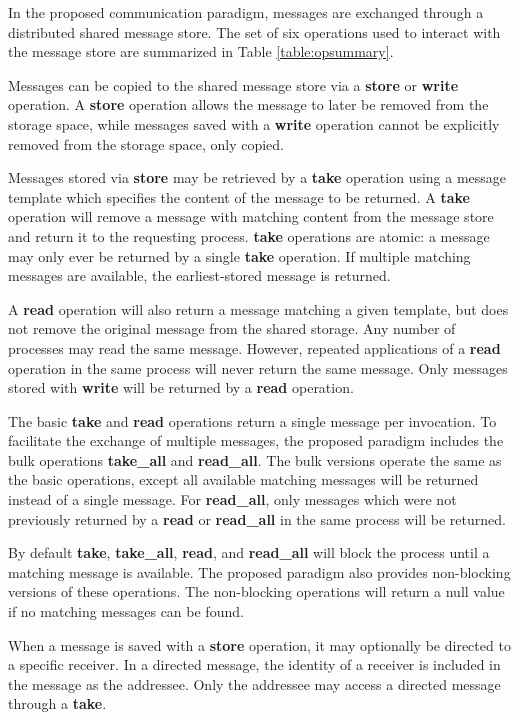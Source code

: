 \documentclass[lnicst]{svmultln}
\begin{document}
In the proposed communication paradigm, messages are exchanged through a distributed shared message store. The set of six operations used to interact with the message store are summarized in Table \ref{table:opsummary}.

Messages can be copied to the shared message store via a \textbf{store} or \textbf{write} operation. A \textbf{store} operation allows the message to later be removed from the storage space, while messages saved with a \textbf{write} operation cannot be explicitly removed from the storage space, only copied.

Messages stored via \textbf{store} may be retrieved by a \textbf{take} operation using a message template which specifies the content of the message to be returned. A \textbf{take} operation will remove a message with matching content from the message store and return it to the requesting process. \textbf{take} operations are atomic: a message may only ever be returned by a single \textbf{take} operation. If multiple matching messages are available, the earliest-stored message is returned.

A \textbf{read} operation will also return a message matching a given template, but does not remove the original message from the shared storage. Any number of processes may read the same message. However, repeated applications of a \textbf{read} operation in the same process will never return the same message. Only messages stored with \textbf{write} will be returned by a \textbf{read} operation.

The basic \textbf{take} and \textbf{read} operations return a single message per invocation. To facilitate the exchange of multiple messages, the proposed paradigm includes the bulk operations \textbf{take\_all} and \textbf{read\_all}. The bulk versions operate the same as the basic operations, except all available matching messages will be returned instead of a single message. For \textbf{read\_all}, only messages which were not previously returned by a \textbf{read} or \textbf{read\_all} in the same process will be returned.

By default \textbf{take}, \textbf{take\_all}, \textbf{read}, and \textbf{read\_all} will block the process until a matching message is available. The proposed paradigm also provides non-blocking versions of these operations. The non-blocking operations will return a null value if no matching messages can be found.

When a message is saved with a \textbf{store} operation, it may optionally be directed to a specific receiver. In a directed message, the identity of a receiver is included in the message as the addressee. Only the addressee may access a directed message through a \textbf{take}.
\end{document}
